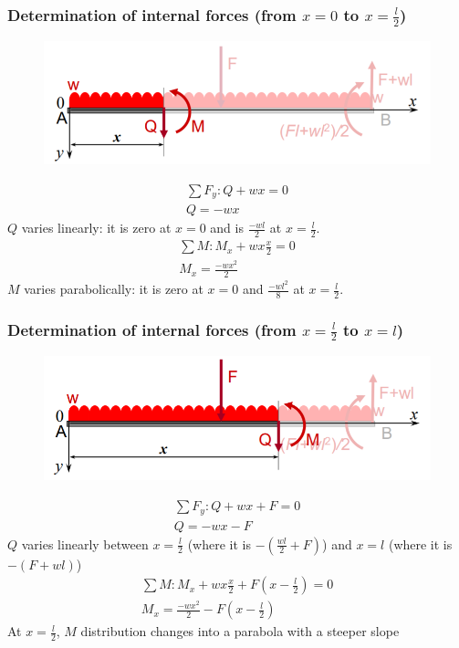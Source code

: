 \documentclass[class=report, crop=false, 12pt,a4paper]{standalone}
\begin{document}
\subsubsection{Determination of internal forces (from $x=0$ to $x=\frac{l}{2}$)}
\begin{figure}[H]
  \centering
  \includegraphics[width = 0.8 \textwidth]{../img/determinationofforces1.PNG}
\end{figure}
\begin{gather*}
  \sum F_y: Q + wx = 0 \\
  Q = -wx
\end{gather*}
$Q$ varies linearly: it is zero at $x=0$ and is $\frac{-wl}{2}$ at $x=\frac{l}{2}$.
\begin{gather*}
  \sum M: M_x + wx\frac{x}{2} = 0 \\
  M_x = \frac{-wx^2}{2}
\end{gather*}
$M$ varies parabolically: it is zero at $x=0$ and $\frac{-wl^2}{8}$ at $x=\frac{l}{2}$.
\subsubsection{Determination of internal forces (from $x=\frac{l}{2}$ to $x=l$)}
\begin{figure}[H]
  \centering
  \includegraphics[width = 0.8 \textwidth]{../img/determinationofforces2.PNG}
\end{figure}
\begin{gather*}
  \sum F_y: Q + wx + F = 0 \\
  Q = -wx -F
\end{gather*}
$Q$ varies linearly between $x=\frac{l}{2}$ (where it is $-(\frac{wl}{2}+F)$) and $x=l$ (where it is $-(F+wl)$)
\begin{gather*}
  \sum M: M_x + wx\frac{x}{2} + F(x-\frac{l}{2})= 0 \\
  M_x = \frac{-wx^2}{2} - F(x-\frac{l}{2})
\end{gather*}
At $x=\frac{l}{2}$, $M$ distribution changes into a parabola with a steeper slope
\end{document}
